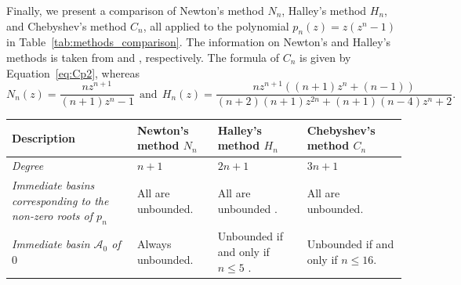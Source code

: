\documentclass[12pt]{article}
\begin{document}
Finally, we present a  comparison of Newton's method $N_n$, Halley's method $H_n$, and Chebyshev's method $C_n$, all applied to the polynomial $p_n (z)=z(z^n-1)$ in Table~\ref{tab:methods_comparison}. The information on Newton's and Halley's methods is taken from \cite{HSS2001} and \cite{CGJ2025,halley-liu-etal-2025}, respectively. The formula of $C_n$ is given by Equation~\eqref{eq:Cp2}, whereas
$$N_n(z)=\frac{nz^{n+1}}{(n+1)z^n-1}~~\text{and}~~H_{n}(z)=\frac{n z^{n+1}\left((n+1) z^{n}+(n-1)\right)}{(n+2)(n+1) z^{2 n}+(n+1)(n-4) z^{n}+2}.$$
\begin{table}[htbp]
	\centering
	\begin{tabular}{|p{2.25cm}| p{4.25cm}| p{4.25cm}| p{4.25cm}|}
		\hline
		\textbf{Description} & \textbf{Newton's method $N_n$} & \textbf{Halley's method $H_n$} & \textbf{Chebyshev's method $C_n$} \\
		\hline
		\textsl{Degree} & $n+1$ & $2n+1$ & $3n+1$\\
		\hline
		\textsl{Immediate basins corresponding to the non-zero roots of $p_n$} &
		All are unbounded. &
		All are unbounded \cite[Theorem~A]{CGJ2025}.\par   &
		All are unbounded.\par
		\\
		\hline
		\textsl{Immediate basin $\mathcal{A}_0$ of $0$} &  Always unbounded. &  Unbounded if and only if $n \leq 5$ \cite[Theorem~A]{CGJ2025}. & Unbounded if  and only if $n \leq 16$. \\
		

\end{tabular}
\end{table}
\end{document}
